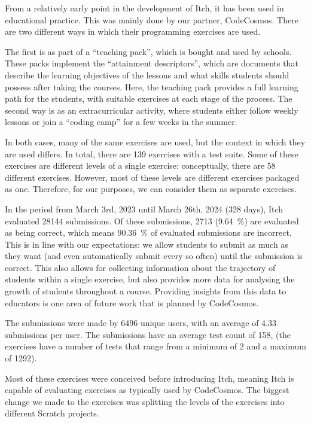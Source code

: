 \documentclass[../main]{subfiles}
\begin{document}
From a relatively early point in the development of Itch, it has been used in educational practice.
This was mainly done by our partner, CodeCosmos.
There are two different ways in which their programming exercises are used.

The first is as part of a ``teaching pack'', which is bought and used by schools.
These packs implement the ``attainment descriptors'', which are documents that describe the learning objectives of the lessons and what skills students should possess after taking the courses.
Here, the teaching pack provides a full learning path for the students, with suitable exercises at each stage of the process.
The second way is as an extracurricular activity, where students either follow weekly lessons or join a ``coding camp'' for a few weeks in the summer.

In both cases, many of the same exercises are used, but the context in which they are used differs.
In total, there are 139 exercises with a test suite.
Some of these exercises are different levels of a single exercise: conceptually, there are 58 different exercises.
However, most of these levels are different exercises packaged as one.
Therefore, for our purposes, we can consider them as separate exercises.

In the period from March 3rd, 2023 until March 26th, 2024 (328 days), Itch evaluated \num{28144} submissions.
Of these submissions, \num{2713} (\qty{9.64}{\percent}) are evaluated as being correct, which means \qty{90.36}{\percent} of evaluated submissions are incorrect.
This is in line with our expectations: we allow students to submit as much as they want (and even automatically submit every so often) until the submission is correct.
This also allows for collecting information about the trajectory of students within a single exercise, but also provides more data for analysing the growth of students throughout a course.
Providing insights from this data to educators is one area of future work that is planned by CodeCosmos.

The submissions were made by \num{6496} unique users, with an average of \num{4.33} submissions per user.
The submissions have an average test count of \num{158}, (the exercises have a number of tests that range from a minimum of \num{2} and a maximum of \num{1292}).

Most of these exercises were conceived before introducing Itch, meaning Itch is capable of evaluating exercises as typically used by CodeCosmos.
The biggest change we made to the exercises was splitting the levels of the exercises into different Scratch projects.
\end{document}
